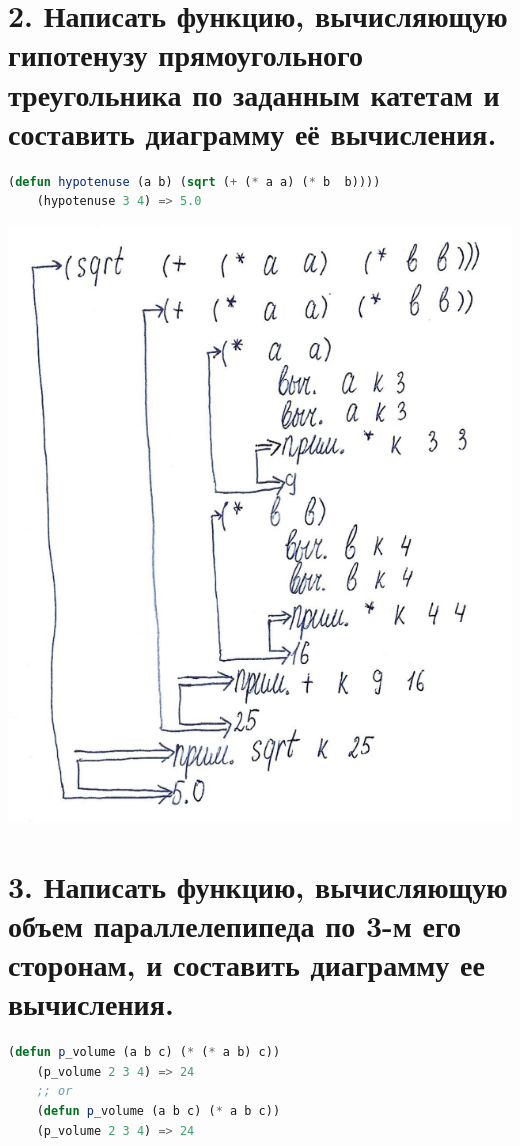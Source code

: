 \documentclass[12pt]{report}
\begin{document}
\clearpage
\section*{2. Написать функцию, вычисляющую гипотенузу прямоугольного треугольника по заданным катетам и составить диаграмму её вычисления.}

\begin{lstlisting}[language=Lisp]
	(defun hypotenuse (a b) (sqrt (+ (* a a) (* b  b))))
	(hypotenuse 3 4) => 5.0 
\end{lstlisting}

\includegraphics[scale=1]{img/2}

\section*{3. Написать функцию, вычисляющую объем параллелепипеда по 3-м его сторонам, и составить диаграмму ее вычисления.}

\begin{lstlisting}[language=Lisp]
	 (defun p_volume (a b c) (* (* a b) c))
	(p_volume 2 3 4) => 24 
	;; or
	(defun p_volume (a b c) (* a b c))
	(p_volume 2 3 4) => 24 
\end{lstlisting}
\end{document}
